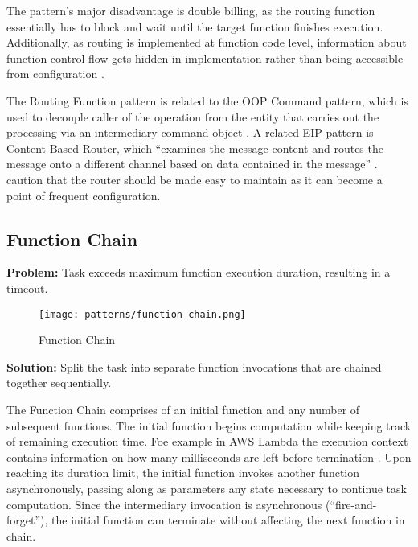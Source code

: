 The pattern's major disadvantage is double billing, as the routing function essentially has to block and wait until the target function finishes execution. Additionally, as routing is implemented at function code level, information about function control flow gets hidden in implementation rather than being accessible from configuration \parencite{leitner18industrialpractice}.

The Routing Function pattern is related to the OOP Command pattern, which is used to decouple caller of the operation from the entity that carries out the processing via an intermediary command object \parencite{gamma94designPatterns}. A related EIP pattern is Content-Based Router, which ``examines the message content and routes the message onto a different channel based on data contained in the message'' \parencite{hohpe2004enterprise}. \textcite{hohpe2004enterprise} caution that the router should be made easy to maintain as it can become a point of frequent configuration.

\subsection{Function Chain} \label{subsec:functionChain}

\textbf{Problem:} Task exceeds maximum function execution duration, resulting in a timeout.

\begin{figure}[h]
  \centering
  \texttt{[image: patterns/function-chain.png]}
  \caption{Function Chain}
  \label{fig:patternFunctionChain}
\end{figure}

\textbf{Solution:} Split the task into separate function invocations that are chained together sequentially.

The Function Chain comprises of an initial function and any number of subsequent functions. The initial function begins computation while keeping track of remaining execution time. Foe example in AWS Lambda the execution context contains information on how many milliseconds are left before termination \parencite{awslambda0218}. Upon reaching its duration limit, the initial function invokes another function asynchronously, passing along as parameters any state necessary to continue task computation. Since the intermediary invocation is asynchronous (``fire-and-forget''), the initial function can terminate without affecting the next function in chain.

